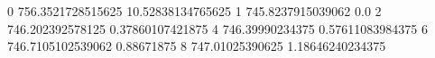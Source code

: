 0 756.3521728515625 10.52838134765625
1 745.8237915039062 0.0
2 746.202392578125 0.37860107421875
4 746.39990234375 0.57611083984375
6 746.7105102539062 0.88671875
8 747.01025390625 1.18646240234375
